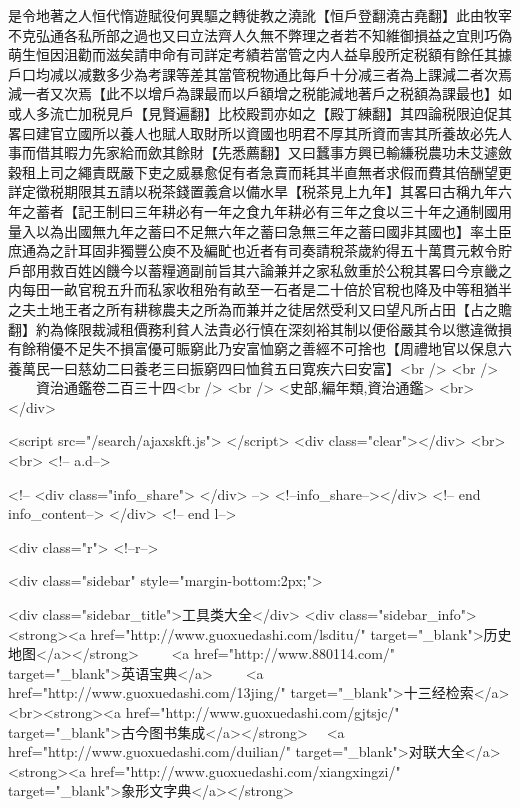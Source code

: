 是令地著之人恒代惰遊賦役何異驅之轉徙教之澆訛【恒戶登翻澆古堯翻】此由牧宰不克弘通各私所部之過也又曰立法齊人久無不弊理之者若不知維御損益之宜則巧偽萌生恒因沮勸而滋矣請申命有司詳定考績若當管之内人益阜殷所定税額有餘任其據戶口均减以减數多少為考課等差其當管稅物通比每戶十分减三者為上課減二者次焉減一者又次焉【此不以增戶為課最而以戶額增之税能減地著戶之税額為課最也】如或人多流亡加税見戶【見賢遍翻】比校殿罰亦如之【殿丁練翻】其四論税限迫促其畧曰建官立國所以養人也賦人取財所以資國也明君不厚其所資而害其所養故必先人事而借其暇力先家給而歛其餘財【先悉薦翻】又曰蠶事方興已輸縑税農功未艾遽斂穀租上司之繩責既嚴下吏之威暴愈促有者急賣而耗其半直無者求假而費其倍酬望更詳定徵税期限其五請以税茶錢置義倉以備水旱【税茶見上九年】其畧曰古稱九年六年之蓄者【記王制曰三年耕必有一年之食九年耕必有三年之食以三十年之通制國用量入以為出國無九年之蓄曰不足無六年之蓄曰急無三年之蓄曰國非其國也】率土臣庶通為之計耳固非獨豐公庾不及編甿也近者有司奏請稅茶歲約得五十萬貫元敕令貯戶部用救百姓凶饑今以蓄糧適副前旨其六論兼并之家私斂重於公稅其畧曰今亰畿之内每田一畝官稅五升而私家收租殆有畝至一石者是二十倍於官稅也降及中等租猶半之夫土地王者之所有耕稼農夫之所為而兼并之徒居然受利又曰望凡所占田【占之贍翻】約為條限裁減租價務利貧人法貴必行慎在深刻裕其制以便俗嚴其令以懲違微損有餘稍優不足失不損富優可賑窮此乃安富恤窮之善經不可捨也【周禮地官以保息六養萬民一曰慈幼二曰養老三曰振窮四曰恤貧五曰寛疾六曰安富】<br />
<br />
　　資治通鑑卷二百三十四<br />
<br />
<史部,編年類,資治通鑑>  <br>
   </div> 

<script src="/search/ajaxskft.js"> </script>
 <div class="clear"></div>
<br>
<br>
 <!-- a.d-->

 <!--
<div class="info_share">
</div> 
-->
 <!--info_share--></div>   <!-- end info_content-->
  </div> <!-- end l-->

<div class="r">   <!--r-->



<div class="sidebar"  style="margin-bottom:2px;">

 
<div class="sidebar_title">工具类大全</div>
<div class="sidebar_info">
<strong><a href="http://www.guoxuedashi.com/lsditu/" target="_blank">历史地图</a></strong>　　
<a href="http://www.880114.com/" target="_blank">英语宝典</a>　　
<a href="http://www.guoxuedashi.com/13jing/" target="_blank">十三经检索</a>　
<br><strong><a href="http://www.guoxuedashi.com/gjtsjc/" target="_blank">古今图书集成</a></strong>　
<a href="http://www.guoxuedashi.com/duilian/" target="_blank">对联大全</a>　<strong><a href="http://www.guoxuedashi.com/xiangxingzi/" target="_blank">象形文字典</a></strong>　

